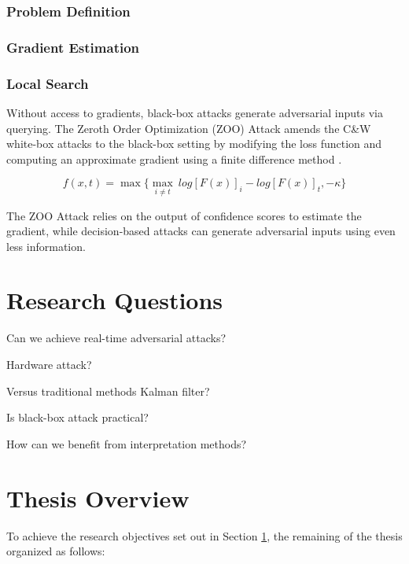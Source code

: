 \subsubsection{Problem Definition}

\subsubsection{Gradient Estimation}

\subsubsection{Local Search}

Without access to gradients, black-box attacks generate adversarial inputs via querying. The Zeroth Order Optimization (ZOO) Attack amends the C\&W white-box attacks to the black-box setting by modifying the loss function and computing an approximate gradient using a finite difference method \citep{Chen_2017}.

\begin{equation}
f(x,t) = \max \{ {\underset{i \neq t}{\max}\ log[F(x)]_i - log[F(x)]_t, -\kappa } \}
\end{equation}

The ZOO Attack relies on the output of confidence scores to estimate the gradient, while decision-based attacks can generate adversarial inputs using even less information.


\clearpage

\section{Research Questions}
\label{sec:research_question}

Can we achieve real-time adversarial attacks?

Hardware attack?

Versus traditional methods Kalman filter?

Is black-box attack practical?

How can we benefit from interpretation methods?

\section{Thesis Overview}

To achieve the research objectives set out in Section \ref{sec:research_question}, the remaining of the thesis organized as follows:

